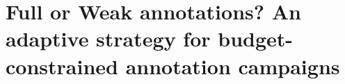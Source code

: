 \graphicspath{{appendices/}{fullweak/}{Figures/}}

\chapter[Full or Weak annotations?]{Full or Weak annotations? An adaptive strategy for budget-constrained annotation campaigns}



